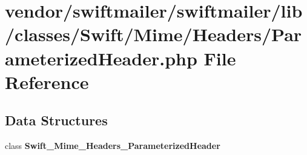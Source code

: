 \section{vendor/swiftmailer/swiftmailer/lib/classes/\+Swift/\+Mime/\+Headers/\+Parameterized\+Header.php File Reference}
\label{_headers_2_parameterized_header_8php}
\subsection*{Data Structures}
\begin{DoxyCompactItemize}
\item 
class {\bf Swift\+\_\+\+Mime\+\_\+\+Headers\+\_\+\+Parameterized\+Header}
\end{DoxyCompactItemize}
